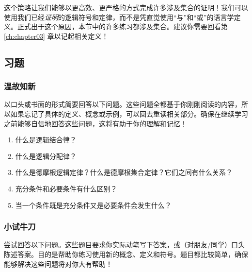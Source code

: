 这个策略让我们能够以更高效、更严格的方式完成许多涉及集合的证明！我们可以使用我们已经\emph{证明}的逻辑符号和定律，而不是凭直觉使用``与''和``或''的语言学定义。正式出于这个原因，本节中的许多练习都涉及集合。建议你需要回看第 \ref{ch:chapter03} 章以记起相关定义！

\subsection{习题}

\subsubsection*{温故知新}

以口头或书面的形式简要回答以下问题。这些问题全都基于你刚刚阅读的内容，所以如果忘记了具体的定义、概念或示例，可以回去重读相关部分。确保在继续学习之前能够自信地回答这些问题，这将有助于你的理解和记忆！

\begin{enumerate}[label=(\arabic*)]
    \item 什么是逻辑结合律？
    \item 什么是逻辑分配律？
    \item 什么是德摩根逻辑定律？什么是德摩根集合定律？它们之间有什么关系？
    \item 充分条件和必要条件有什么区别？
    \item 当一个条件既是充分条件又是必要条件会发生什么？
\end{enumerate}

\subsubsection*{小试牛刀}

尝试回答以下问题。这些题目要求你实际动笔写下答案，或（对朋友/同学）口头陈述答案。目的是帮助你练习使用新的概念、定义和符号。题目都比较简单，确保能够解决这些问题将对你大有帮助！

